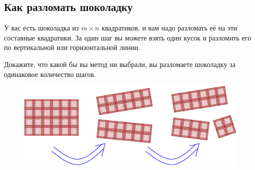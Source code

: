 \subsection*{Как разломать шоколадку}%

У вас есть шоколадка из $m\times n$ квадратиков, и вам надо разломать её на эти составные квадратики.
За один шаг вы можете взять один кусок и разломить его по вертикальной или горизонтальной линии.

Докажите, что какой бы вы метод ни выбрали, вы разломаете шоколадку за одинаковое количество шагов.

\begin{figure}[h!]
\centering
\includegraphics[scale=0.5]{Figs/Algorithms/bar}
\end{figure}
